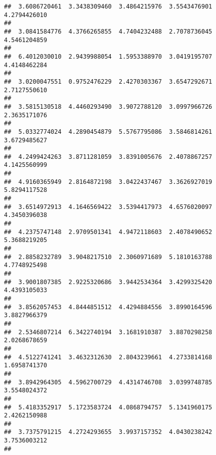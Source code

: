 \documentclass[]{article}
\begin{document}
\begin{verbatim}
##  3.6086720461  3.3438309460  3.4864215976  3.5543476901  4.2794426010 
##                                                                       
##  3.0841584776  4.3766265855  4.7404232488  2.7078736045  4.5461204859 
##                                                                       
##  6.4012030010  2.9439988054  1.5953388970  3.0419195707  4.4148462284 
##                                                                       
##  3.0200047551  0.9752476229  2.4270303367  3.6547292671  2.7127550610 
##                                                                       
##  3.5815130518  4.4460293490  3.9072788120  3.0997966726  2.3635171076 
##                                                                       
##  5.0332774024  4.2890454879  5.5767795086  3.5846814261  3.6729485627 
##                                                                       
##  4.2499424263  3.8711281059  3.8391005676  2.4078867257  4.1425560999 
##                                                                       
##  4.9160365949  2.8164872198  3.0422437467  3.3626927019  5.8294117528 
##                                                                       
##  3.6514972913  4.1646569422  3.5394417973  4.6576020097  4.3450396038 
##                                                                       
##  4.2375747148  2.9709501341  4.9472118603  2.4078490652  5.3688219205 
##                                                                       
##  2.8858232789  3.9048217510  2.3060971689  5.1810163788  4.7748925498 
##                                                                       
##  3.9001807385  2.9225320686  3.9442534364  3.4299325420  4.4393105033 
##                                                                       
##  3.8562057453  4.8444851512  4.4294884556  3.8990164596  3.8827966379 
##                                                                       
##  2.5346807214  6.3422740194  3.1681910387  3.8870298258  2.0268678659 
##                                                                       
##  4.5122741241  3.4632312630  2.8043239661  4.2733814168  1.6958741370 
##                                                                       
##  3.8942964305  4.5962700729  4.4314746708  3.0399748785  3.5548024372 
##                                                                       
##  5.4183352917  5.1723583724  4.0868794757  5.1341960175  2.4262150988 
##                                                                       
##  3.7375791215  4.2724293655  3.9937157352  4.0430238242  3.7536003212 
##                                                                       

\end{verbatim}
\end{document}
